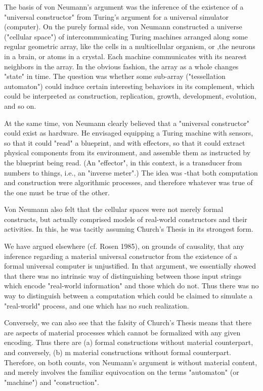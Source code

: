 \documentclass[a4paper,12pt]{article}
\begin{document}
The basis of von Neumann's argument was the inference of the existence of a "universal constructor" from Turing's
argument for a universal simulator (computer).  On the purely formal side, von Neumann constructed
a universe ("cellular space") of intercommunicating Turing machines arranged along some regular geometric array,
like the cells in a multicellular organism, or ,the neurons in a brain, or atoms in a crystal. Each machine
communicates with its nearest neighbors in the array. In the obvious fashion, the array as a whole changes "state" in time.
The question was whether some sub-array ("tessellation automaton") could induce certain interesting behaviors in its complement,
which could be interpreted as construction, replication, growth, development, evolution, and so on.

At the same time, von Neumann clearly believed that a "universal constructor" could exist as hardware. He envisaged equipping a Turing machine
with sensors, so that it could "read" a blueprint, and with effectors,
so that it could extract physical components from its environment, and
assemble them as instructed by the blueprint being read. (An "effector",
in this context, is a transducer from numbers to things, i.e., an "inverse
meter".) The idea was -that both computation and construction were algorithmic processes,
and therefore whatever was true of the one must be true
of the other.

Von Neumann also felt that the cellular spaces were not merely formal constructs, but actually comprised models of real-world
constructors and their activities. In this, he was tacitly assuming Church's Thesis in its strongest form.

We have argued elsewhere (cf. Rosen 1985), on grounds of causality, that
any inference regarding a material universal constructor from the existence
of a formal universal computer is unjustified.  In that argument, we essentially
showed that there was no intrinsic way of distinguishing between
those input strings which encode "real-world information" and those which
do not. Thus there was no way to distinguish between a computation which
could be claimed to simulate a "real-world" process, and one which has no
such realization.

Conversely, we can also see that the falsity of Church's Thesis means that there are aspects of material processes which cannot be formalized with any given encoding.
Thus there are (a) formal constructions without material counterpart, and conversely, (b) m material constructions without formal counterpart.
Therefore, on both counts, von Neumann's argument is without material content, and merely involves the familiar equivocation on
the terms "automaton" (or "machine") and "construction".
\end{document}
